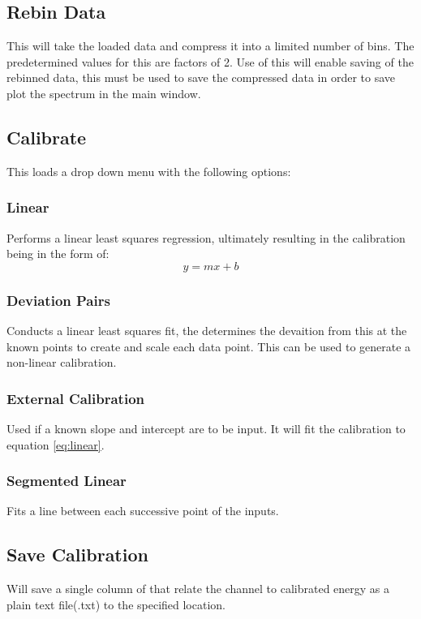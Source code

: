 	\subsection{Rebin Data}
		This will take the loaded data and compress it into a limited number of bins. The predetermined values for this are factors of 2. Use of this will enable saving of the rebinned data, this must be used to save the compressed data in order to save plot the spectrum in the main window. 

	\subsection{Calibrate}
		This loads a drop down menu with the following options:
				\subsubsection{Linear}
				Performs a linear least squares regression, ultimately resulting in the calibration being in the form of:
				\begin{equation}
				 	y=mx+b
				\label{eq:linear}
				\end{equation}
				\subsubsection{Deviation Pairs}
				Conducts a linear least squares fit, the determines the devaition from this at the known points to create and scale each data point. This can be used to generate a non-linear calibration.
				\subsubsection{External Calibration}
				Used if a known slope and intercept are to be input. It will fit the calibration to equation \ref{eq:linear}.
				\subsubsection{Segmented Linear}
				Fits a line between each successive point of the inputs.
	\subsection{Save Calibration}
	Will save a single column of that relate the channel to calibrated energy as a plain text file(.txt) to the specified location.